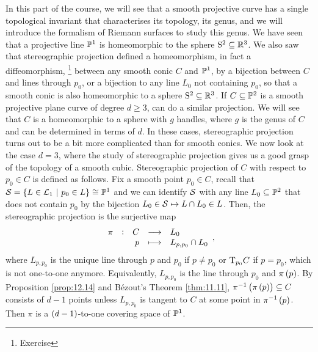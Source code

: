 In this part of the course, we will see that a smooth projective curve has a single topological invariant that characterises its topology, its genus, and we will introduce the formalism of Riemann surfaces to study this genus. We have seen that a projective line $ \mathbb{P}^1 $ is homeomorphic to the sphere $ \mathrm{S}^2 \subseteq \mathbb{R}^3 $. We also saw that stereographic projection defined a homeomorphism, in fact a diffeomorphism, \footnote{Exercise} between any smooth conic $ C $ and $ \mathbb{P}^1 $, by a bijection between $ C $ and lines through $ p_0 $, or a bijection to any line $ L_0 $ not containing $ p_0 $, so that a smooth conic is also homeomorphic to a sphere $ \mathrm{S}^2 \subseteq \mathbb{R}^3 $. If $ C \subseteq \mathbb{P}^2 $ is a smooth projective plane curve of degree $ d \ge 3 $, can do a similar projection. We will see that $ C $ is a homeomorphic to a sphere with $ g $ handles, where $ g $ is the genus of $ C $ and can be determined in terms of $ d $. In these cases, stereographic projection turns out to be a bit more complicated than for smooth conics. We now look at the case $ d = 3 $, where the study of stereographic projection gives us a good grasp of the topology of a smooth cubic. Stereographic projection of $ C $ with respect to $ p_0 \in C $ is defined as follows. Fix a smooth point $ p_0 \in C $, recall that $ \SSS = \cbr{L \in \LLL_1 \st p_0 \in L} \cong \PP^1 $ and we can identify $ \mathcal{S} $ with any line $ L_0 \subseteq \mathbb{P}^2 $ that does not contain $ p_0 $ by the bijection $ L_0 \in \mathcal{S} \mapsto L \cap L_0 \in L $. Then, the stereographic projection is the surjective map
$$ \function[\pi]{C}{L_0}{p}{L_{p, p_0} \cap L_0}, $$
where $ L_{p, p_0} $ is the unique line through $ p $ and $ p_0 $ if $ p \ne p_0 $ or $ \mathrm{T}_{p_0} C $ if $ p = p_0 $, which is not one-to-one anymore. Equivalently, $ L_{p, p_0} $ is the line through $ p_0 $ and $ \pi\br{p} $. By Proposition \ref{prop:12.14} and B\'ezout's Theorem \ref{thm:11.11}, $ \pi^{-1}\br{\pi\br{p}} \subseteq C $ consists of $ d - 1 $ points unless $ L_{p, p_0} $ is tangent to $ C $ at some point in $ \pi^{-1}\br{p} $. Then $ \pi $ is a $ \br{d - 1} $-to-one covering space of $ \mathbb{P}^1 $.


